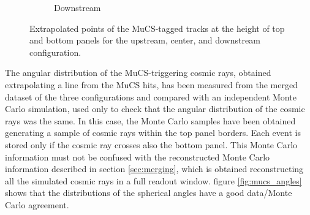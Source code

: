 \documentclass[a4paper]{scrartcl}
\begin{document}
\begin{figure}[htbp]
\begin{subfigure}{0.32\textwidth}
    \caption{Downstream} \label{fig:downstream_align}
  \end{subfigure}

  \caption{Extrapolated points of the MuCS-tagged tracks at the height of top and bottom panels for the upstream, center, and downstream configuration.} \label{fig:alignment}
\end{figure}

The angular distribution of the MuCS-triggering cosmic rays, obtained extrapolating a line from the MuCS hits, has been measured from the merged dataset of the three configurations and compared with an independent Monte Carlo simulation, used only to check that the angular distribution of the cosmic rays was the same.  In this case, the Monte Carlo samples have been obtained generating a sample of cosmic rays within the top panel borders. Each event is stored only if the cosmic ray crosses also the bottom panel. This Monte Carlo information must not be confused with the reconstructed Monte Carlo information described in section \ref{sec:merging}, which is obtained reconstructing all the simulated cosmic rays in a full readout window. figure \ref{fig:mucs_angles} shows that the distributions of the spherical angles have a good data/Monte Carlo agreement.
\end{document}
